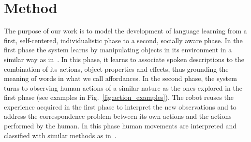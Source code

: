 \vspace{-3mm}

\section{Method}
\label{sec:method}


The purpose of our work is to model the development of language learning from a first, self-centered, individualistic phase to a second, socially aware phase.
In the first phase the system learns by manipulating objects in its environment in a similar way as in~\cite{salvi:2012:smcb}.
In this phase, it learns to associate spoken descriptions to the combination of its actions, object properties and effects, thus grounding the meaning of words in what we call affordances.
In the second phase, the system turns to observing human actions of a similar nature as the ones explored in the first phase (see examples in Fig.~\ref{fig:action_examples}).
The robot reuses the experience acquired in the first phase to interpret the new observations and to address the correspondence problem between its own actions and the actions performed by the human.
In this phase human movements are interpreted and classified with similar methods as in~\cite{saponaro:2013:crhri}.

